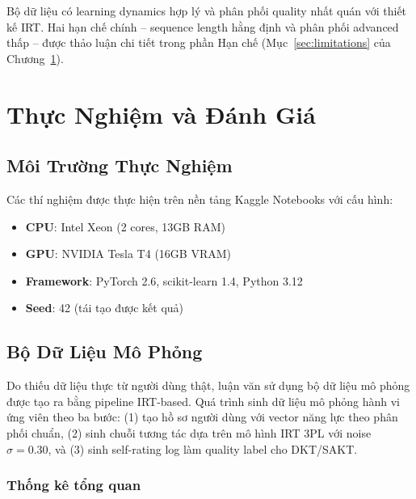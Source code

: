 \documentclass[12pt, a4paper]{report}
\begin{document}
Bộ dữ liệu có learning dynamics hợp lý và phân phối quality nhất quán với thiết kế IRT. Hai hạn chế chính -- sequence length hằng định và phân phối advanced thấp -- được thảo luận chi tiết trong phần Hạn chế (Mục~\ref{sec:limitations} của Chương~\ref{chap:experiment}).

\chapter{Thực Nghiệm và Đánh Giá}
\label{chap:experiment}

\section{Môi Trường Thực Nghiệm}
\label{sec:env}

Các thí nghiệm được thực hiện trên nền tảng Kaggle Notebooks với cấu hình:
\begin{itemize}
  \item \textbf{CPU}: Intel Xeon (2 cores, 13GB RAM)
  \item \textbf{GPU}: NVIDIA Tesla T4 (16GB VRAM)
  \item \textbf{Framework}: PyTorch 2.6, scikit-learn 1.4, Python 3.12
  \item \textbf{Seed}: 42 (tái tạo được kết quả)
\end{itemize}

\section{Bộ Dữ Liệu Mô Phỏng}
\label{sec:dataset}

Do thiếu dữ liệu thực từ người dùng thật, luận văn sử dụng bộ dữ liệu mô phỏng được tạo ra bằng pipeline IRT-based. Quá trình sinh dữ liệu mô phỏng hành vi ứng viên theo ba bước: (1) tạo hồ sơ người dùng với vector năng lực theo phân phối chuẩn, (2) sinh chuỗi tương tác dựa trên mô hình IRT 3PL với noise $\sigma = 0.30$, và (3) sinh self-rating log làm quality label cho DKT/SAKT.

\subsection{Thống kê tổng quan}
\end{document}
